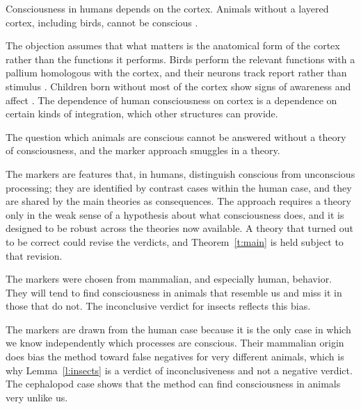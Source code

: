 \documentclass{situationist-preprint}
\begin{document}
\begin{objection}[No cortex]\label{o:cortex}
Consciousness in humans depends on the cortex. Animals without a layered cortex, including birds, cannot be conscious \citep{Key2016}.
\end{objection}

\begin{reply}
The objection assumes that what matters is the anatomical form of the cortex rather than the functions it performs. Birds perform the relevant functions with a pallium homologous with the cortex, and their neurons track report rather than stimulus \citep{Nieder2020}. Children born without most of the cortex show signs of awareness and affect \citep{Merker2007}. The dependence of human consciousness on cortex is a dependence on certain kinds of integration, which other structures can provide.
\end{reply}

\begin{objection}\label{o:theory}
The question which animals are conscious cannot be answered without a theory of consciousness, and the marker approach smuggles in a theory.
\end{objection}

\begin{reply}
The markers are features that, in humans, distinguish conscious from unconscious processing; they are identified by contrast cases within the human case, and they are shared by the main theories as consequences. The approach requires a theory only in the weak sense of a hypothesis about what consciousness does, and it is designed to be robust across the theories now available. A theory that turned out to be correct could revise the verdicts, and Theorem~\ref{t:main} is held subject to that revision.
\end{reply}

\begin{objection}\label{o:bias}
The markers were chosen from mammalian, and especially human, behavior. They will tend to find consciousness in animals that resemble us and miss it in those that do not. The inconclusive verdict for insects reflects this bias.
\end{objection}

\begin{reply}
The markers are drawn from the human case because it is the only case in which we know independently which processes are conscious. Their mammalian origin does bias the method toward false negatives for very different animals, which is why Lemma~\ref{l:insects} is a verdict of inconclusiveness and not a negative verdict. The cephalopod case shows that the method can find consciousness in animals very unlike us.
\end{reply}
\end{document}
